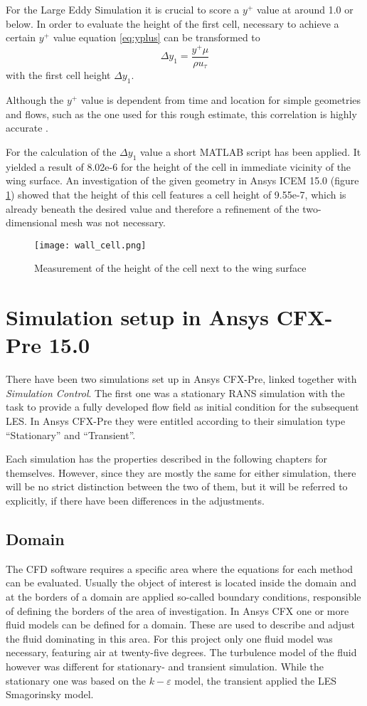For the Large Eddy Simulation it is crucial to score a $y^+$ value at around 1.0 or below. In order to evaluate the height of the first cell, necessary to achieve a certain $y^+$ value equation \ref{eq:yplus} can be transformed to
\begin{equation}
\Delta y_1 = \frac{y^+ \mu}{\rho u_{\tau}}
\end{equation}  
with the first cell height $\Delta y_1$.

Although the $y^+$ value is dependent from time and location for simple geometries and flows, such as the one used for this rough estimate, this correlation is highly accurate \cite{versteeg, hassler, leap team}.

For the calculation of the $\Delta y_1$ value a short MATLAB\textsuperscript{\textregistered} script has been applied. It yielded a result of 8.02e-6 for the height of the cell in immediate vicinity of the wing surface. An investigation of the given geometry in Ansys ICEM 15.0 (figure \ref{fig:y1_height}) showed that the height of this cell features a cell height of 9.55e-7, which is already beneath the desired value and therefore a refinement of the two-dimensional mesh was not necessary. 
\begin{figure}[ht]
\centering
\texttt{[image: wall\_cell.png]}
\caption{Measurement of the height of the cell next to the wing surface}
\label{fig:y1_height}
\end{figure}

\section{Simulation setup in Ansys CFX-Pre 15.0}
There have been two simulations set up in Ansys CFX-Pre, linked together with \emph{Simulation Control}. The first one was a stationary RANS simulation with the task to provide a fully developed flow field as initial condition for the subsequent LES. In Ansys CFX-Pre they were entitled according to their simulation type ``Stationary'' and ``Transient''.

Each simulation has the properties described in the following chapters for themselves. However, since they are mostly the same for either simulation, there will be no strict distinction between the two of them, but it will be referred to explicitly, if there have been differences in the adjustments.
\subsection{Domain}
The CFD software requires a specific area where the equations for each method can be evaluated. Usually the object of interest is located inside the domain and at the borders of a domain are applied so-called boundary conditions, responsible of defining the borders of the area of investigation.
In Ansys CFX one or more fluid models can be defined for a domain. These are used to describe and adjust the fluid dominating in this area. For this project only one fluid model was necessary, featuring air at twenty-five degrees.
The turbulence model of the fluid however was different for stationary- and transient simulation. While the stationary one was based on the $k-\varepsilon$ model, the transient applied the LES Smagorinsky model.

